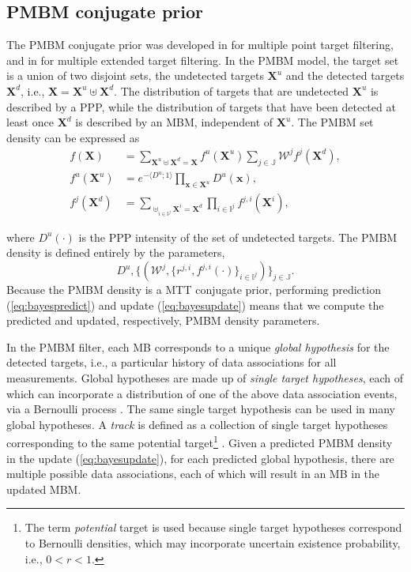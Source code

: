\documentclass[journal]{IEEEtran}
\begin{document}
\subsection{PMBM conjugate prior}

The PMBM conjugate prior was developed in \cite{pmbmpoint} for multiple point target filtering, and in \cite{pmbmextended,pmbmextended2} for multiple extended target filtering. In the PMBM model, the target set is a union of two disjoint sets, the undetected targets $\mathbf{X}^u$ and the detected targets $\mathbf{X}^d$, i.e., $\mathbf{X} = \mathbf{X}^u\uplus\mathbf{X}^d$. The distribution of targets that are undetected $\mathbf{X}^u$ is described by a PPP, while the distribution of targets that have been detected at least once $\mathbf{X}^d$ is described by an MBM, independent of $\mathbf{X}^u$. The PMBM set density can be expressed as
\begin{subequations}
\begin{align}
    f(\mathbf{X}) &= \sum_{\mathbf{X}^u\uplus\mathbf{X}^d=\mathbf{X}}f^u(\mathbf{X}^u)\sum_{j\in\mathbb{J}}\mathcal{W}^jf^j(\mathbf{X}^d),\\
    f^u(\mathbf{X}^u) &= e^{-\langle D^u;1\rangle}\prod_{\mathbf{x}\in\mathbf{X}^u}D^u(\mathbf{x}),\\
    f^j(\mathbf{X}^d) &= \sum_{\uplus_{i\in\mathbb{I}^j}\mathbf{X}^i=\mathbf{X}^d}\prod_{i\in\mathbb{I}^j}f^{j,i}(\mathbf{X}^i),
    \label{eq:mbmdensity}
\end{align}
\label{eq:pmbm}
\end{subequations}

\noindent where $D^u(\cdot)$ is the PPP intensity of the set of undetected targets. The PMBM density is defined entirely by the parameters,
\begin{equation}
D^u, \{(\mathcal{W}^j,\{r^{j,i},f^{j,i}(\cdot)\}_{i\in\mathbb{I}^j})\}_{j\in\mathbb{J}}.
\label{eq:update}
\end{equation}
Because the PMBM density is a MTT conjugate prior, performing prediction (\ref{eq:bayespredict}) and update (\ref{eq:bayesupdate}) means that we compute the predicted and updated, respectively, PMBM density parameters.

In the PMBM filter, each MB corresponds to a unique \textit{global hypothesis} for the detected targets, i.e., a particular history of data associations for all measurements. Global hypotheses are made up of \textit{single target hypotheses}, each of which can incorporate a distribution of one of the above data association events, via a Bernoulli process \cite{pmbmpoint}. The same single target hypothesis can be used in many global hypotheses. A \textit{track} is defined as a collection of single target hypotheses corresponding to the same potential target\footnote{The term \textit{potential} target is used because single target hypotheses correspond to Bernoulli densities, which may incorporate uncertain existence probability, i.e., $0<r<1$.} \cite{pmbmpoint}. Given a predicted PMBM density in the update (\ref{eq:bayesupdate}), for each predicted global hypothesis, there are multiple possible data associations, each of which will result in an MB in the updated MBM.
\end{document}
